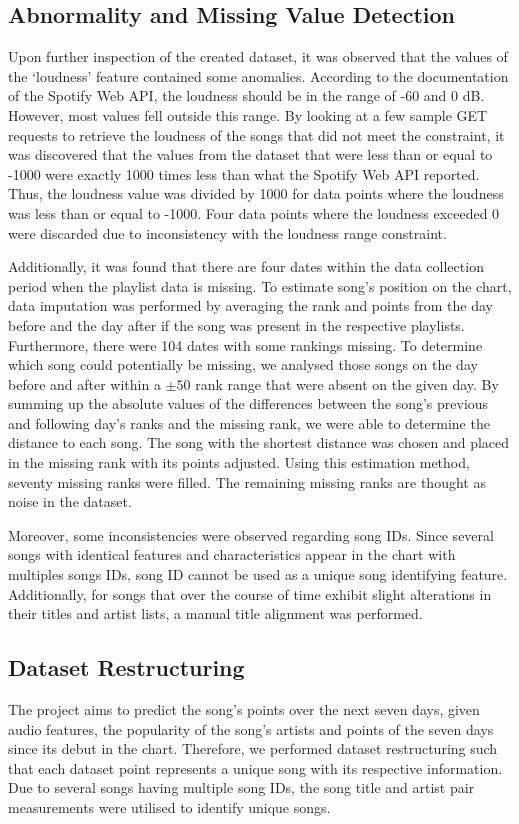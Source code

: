 \documentclass{article}
\begin{document}
\subsection{Abnormality and Missing Value Detection} \label{data_noise}
Upon further inspection of the created dataset, it was observed that the values of the ‘loudness’ feature contained some anomalies. According to the documentation of the Spotify Web API\cite{spotifySpotifyDevelopers}, the loudness should be in the range of -60 and 0 dB. However, most values fell outside this range. By looking at a few sample GET requests to retrieve the loudness of the songs that did not meet the constraint, it was discovered that the values from the dataset that were less than or equal to -1000 were exactly 1000 times less than what the Spotify Web API reported. Thus, the loudness value was divided by 1000 for data points where the loudness was less than or equal to -1000. Four data points where the loudness exceeded 0 were discarded due to inconsistency with the loudness range constraint.

Additionally, it was found that there are four dates within the data collection period when the playlist data is missing. To estimate song’s position on the chart, data imputation was performed by averaging the rank and points from the day before and the day after if the song was present in the respective playlists. Furthermore, there were 104 dates with some rankings missing. To determine which song could potentially be missing, we analysed those songs on the day before and after within a $\pm 50$ rank range that were absent on the given day. By summing up the absolute values of the differences between the song's previous and following day's ranks and the missing rank, we were able to determine the distance to each song. The song with the shortest distance was chosen and placed in the missing rank with its points adjusted. Using this estimation method, seventy missing ranks were filled. The remaining missing ranks are thought as noise in the dataset.

Moreover, some inconsistencies were observed regarding song IDs. Since several songs with identical features and characteristics appear in the chart with multiples songs IDs, song ID cannot be used as a unique song identifying feature. Additionally, for songs that over the course of time exhibit slight alterations in their titles and artist lists, a manual title alignment was performed. 

\subsection{Dataset Restructuring}
The project aims to predict the song’s points over the next seven days, given audio features, the popularity of the song’s artists and points of the seven days since its debut in the chart. Therefore, we performed dataset restructuring such that each dataset point represents a unique song with its respective information. Due to several songs having multiple song IDs, the song title and artist pair measurements were utilised to identify unique songs. 
\end{document}
